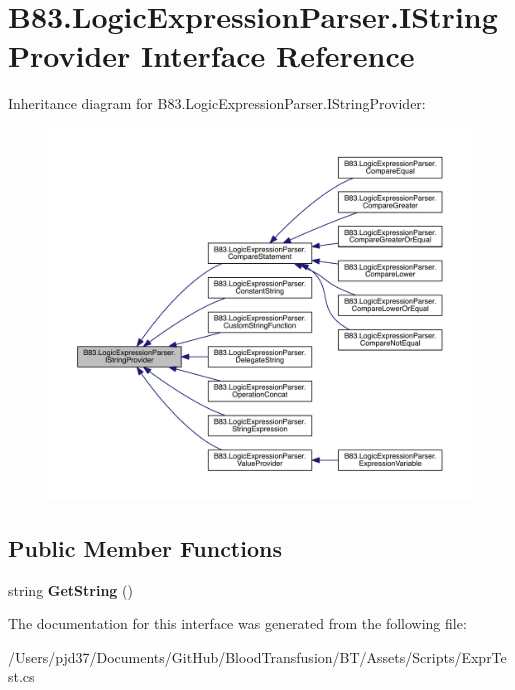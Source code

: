 \hypertarget{interface_b83_1_1_logic_expression_parser_1_1_i_string_provider}{}\section{B83.\+Logic\+Expression\+Parser.\+I\+String\+Provider Interface Reference}
\label{interface_b83_1_1_logic_expression_parser_1_1_i_string_provider}


Inheritance diagram for B83.\+Logic\+Expression\+Parser.\+I\+String\+Provider\+:\nopagebreak
\begin{figure}[H]
\begin{center}
\leavevmode
\includegraphics[width=350pt]{interface_b83_1_1_logic_expression_parser_1_1_i_string_provider__inherit__graph}
\end{center}
\end{figure}
\subsection*{Public Member Functions}
\begin{DoxyCompactItemize}
\item 
string {\bfseries Get\+String} ()\hypertarget{interface_b83_1_1_logic_expression_parser_1_1_i_string_provider_a76f9c7b76496a6457dda77917fb67f52}{}\label{interface_b83_1_1_logic_expression_parser_1_1_i_string_provider_a76f9c7b76496a6457dda77917fb67f52}

\end{DoxyCompactItemize}


The documentation for this interface was generated from the following file\+:\begin{DoxyCompactItemize}
\item 
/\+Users/pjd37/\+Documents/\+Git\+Hub/\+Blood\+Transfusion/\+B\+T/\+Assets/\+Scripts/Expr\+Test.\+cs\end{DoxyCompactItemize}

